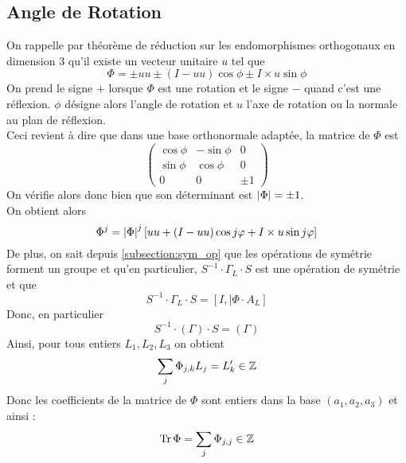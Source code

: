 \documentclass{cours}
\begin{document}
\subsection{Angle de Rotation}
On rappelle par théorème de réduction sur les endomorphismes orthogonaux en dimension $3$ qu'il existe un vecteur unitaire $u$ tel que
\begin{equation}\label{eq:red_ortho}
    \Phi = \pm uu \pm (I - uu) \cos \phi \pm I \times u \sin \phi
\end{equation}
On prend le signe $+$ lorsque $\Phi$ est une rotation et le signe $-$ quand c'est une réflexion. $\phi$ désigne alors l'angle de rotation et $u$ l'axe de rotation ou la normale au plan de réflexion. \\
Ceci revient à dire que dans une base orthonormale adaptée, la matrice de $\Phi$ est
\begin{equation}
    \begin{pmatrix}
        \cos \phi & -\sin \phi & 0     \\
        \sin \phi & \cos \phi  & 0     \\
        0         & 0          & \pm 1
    \end{pmatrix}
\end{equation}
On vérifie alors donc bien que son déterminant est $\left|\Phi\right| = \pm 1$.\\
On obtient alors
\begin{equation}\label{eq:pow2}
    \Phi^{j} = \left|\Phi\right|^{j}\left[uu + (I - uu) \cos j\varphi + I \times u \sin j\varphi\right]
\end{equation}
De plus, on sait depuis \ref{subsection:sym_op} que les opérations de symétrie forment un groupe et qu'en particulier, $S^{-1} \cdot \Gamma_{L} \cdot S$ est une opération de symétrie et que
\begin{equation}
    S^{-1} \cdot \Gamma_{L} \cdot S = \left[I, \mid \Phi \cdot A_{L}\right]
\end{equation}
Donc, en particulier
\begin{equation}
    S^{-1} \cdot \left(\Gamma\right) \cdot S = \left(\Gamma\right)
\end{equation}
Ainsi, pour tous entiers $L_{1}, L_{2}, L_{3}$ on obtient
\begin{equation}
    \sum_{j}\Phi_{j, k}L_{j} = L_{k}'\in \mathbb{Z}
\end{equation}
Donc les coefficients de la matrice de $\Phi$ sont entiers dans la base $\left(a_{1}, a_{2}, a_{3}\right)$ et ainsi :
\begin{equation}
    \operatorname{Tr} \Phi = \sum_{j} \Phi_{j, j} \in \mathbb{Z}
\end{equation}
\end{document}
